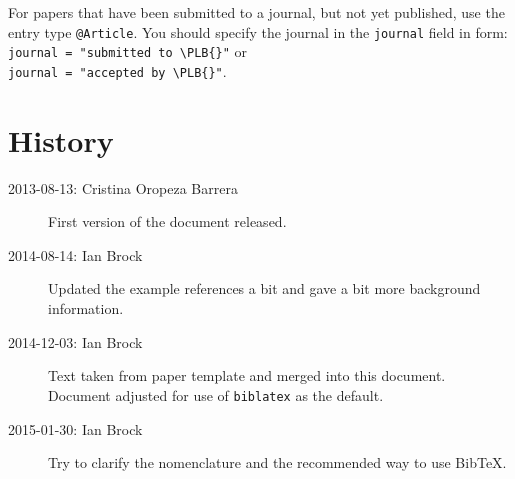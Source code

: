 \documentclass[UKenglish,texlive=2013]{latex/atlasdoc}
\newcommand*{\BibTeX}{Bib\TeX}
\newcommand{\Macro}[1]{\texttt{\textbackslash #1}\xspace}
\newcommand{\Package}[1]{\texttt{#1}\xspace}
\begin{document}
For papers that have been submitted to a journal, but not yet published, use the entry type \texttt{@Article}.
You should specify the journal in the \texttt{journal} field in form:\\
\texttt{journal = "submitted to \Macro{PLB}{}\{\}"} or\\
\texttt{journal = "accepted by \Macro{PLB}{}\{\}"}.


\section*{History}

\begin{description}
\item[2013-08-13: Cristina Oropeza Barrera] First version of the document released.
\item[2014-08-14: Ian Brock] Updated the example references a bit and gave a bit more background information.
\item[2014-12-03: Ian Brock] Text taken from paper template and merged into this document. 
  Document adjusted for use of \Package{biblatex} as the default.
\item[2015-01-30: Ian Brock] Try to clarify the nomenclature and 
  the recommended way to use \BibTeX.
\end{description}

\printbibliography
%
%
\end{document}
